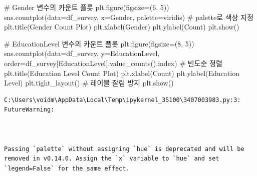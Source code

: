 \documentclass[
  letterpaper,
]{book}
\newenvironment{Shaded}{\begin{snugshade}}{\end{snugshade}}
\newcommand{\CommentTok}[1]{\textcolor[rgb]{0.37,0.37,0.37}{#1}}
\newcommand{\DecValTok}[1]{\textcolor[rgb]{0.68,0.00,0.00}{#1}}
\newcommand{\NormalTok}[1]{\textcolor[rgb]{0.00,0.23,0.31}{#1}}
\newcommand{\OperatorTok}[1]{\textcolor[rgb]{0.37,0.37,0.37}{#1}}
\newcommand{\StringTok}[1]{\textcolor[rgb]{0.13,0.47,0.30}{#1}}
\begin{document}
\begin{Shaded}
\begin{Highlighting}[]
\CommentTok{\# Gender 변수의 카운트 플롯}
\NormalTok{plt.figure(figsize}\OperatorTok{=}\NormalTok{(}\DecValTok{6}\NormalTok{, }\DecValTok{5}\NormalTok{))}
\NormalTok{sns.countplot(data}\OperatorTok{=}\NormalTok{df\_survey, x}\OperatorTok{=}\StringTok{\textquotesingle{}Gender\textquotesingle{}}\NormalTok{, palette}\OperatorTok{=}\StringTok{\textquotesingle{}viridis\textquotesingle{}}\NormalTok{) }\CommentTok{\# palette로 색상 지정}
\NormalTok{plt.title(}\StringTok{\textquotesingle{}Gender Count Plot\textquotesingle{}}\NormalTok{)}
\NormalTok{plt.xlabel(}\StringTok{\textquotesingle{}Gender\textquotesingle{}}\NormalTok{)}
\NormalTok{plt.ylabel(}\StringTok{\textquotesingle{}Count\textquotesingle{}}\NormalTok{)}
\NormalTok{plt.show()}

\CommentTok{\# EducationLevel 변수의 카운트 플롯}
\NormalTok{plt.figure(figsize}\OperatorTok{=}\NormalTok{(}\DecValTok{8}\NormalTok{, }\DecValTok{5}\NormalTok{))}
\NormalTok{sns.countplot(data}\OperatorTok{=}\NormalTok{df\_survey, y}\OperatorTok{=}\StringTok{\textquotesingle{}EducationLevel\textquotesingle{}}\NormalTok{, order}\OperatorTok{=}\NormalTok{df\_survey[}\StringTok{\textquotesingle{}EducationLevel\textquotesingle{}}\NormalTok{].value\_counts().index) }\CommentTok{\# 빈도순 정렬}
\NormalTok{plt.title(}\StringTok{\textquotesingle{}Education Level Count Plot\textquotesingle{}}\NormalTok{)}
\NormalTok{plt.xlabel(}\StringTok{\textquotesingle{}Count\textquotesingle{}}\NormalTok{)}
\NormalTok{plt.ylabel(}\StringTok{\textquotesingle{}Education Level\textquotesingle{}}\NormalTok{)}
\NormalTok{plt.tight\_layout() }\CommentTok{\# 레이블 잘림 방지}
\NormalTok{plt.show()}
\end{Highlighting}
\end{Shaded}

\begin{verbatim}
C:\Users\voidm\AppData\Local\Temp\ipykernel_35100\3407003983.py:3: FutureWarning:



Passing `palette` without assigning `hue` is deprecated and will be removed in v0.14.0. Assign the `x` variable to `hue` and set `legend=False` for the same effect.

\end{verbatim}
\end{document}
